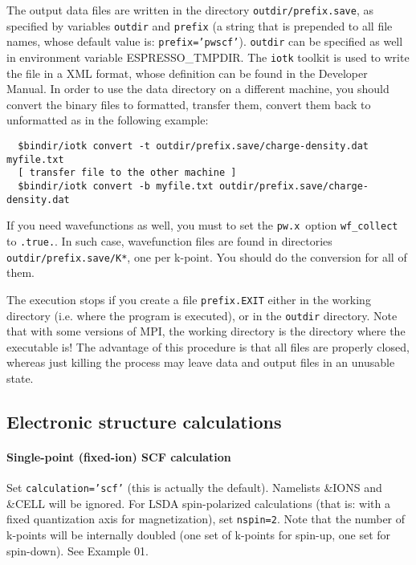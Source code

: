 \documentclass[12pt,a4paper]{article}
\def\pwx{\texttt{pw.x}}
\begin{document}
The output data files are written in the directory \texttt{outdir/prefix.save}, as specified by variables
\texttt{outdir} and \texttt{prefix} 
(a string that is prepended
to all file names, whose default value is: \texttt{prefix='pwscf'}). \texttt{outdir} can be specified
as well in environment variable ESPRESSO\_TMPDIR. The \texttt{iotk}
toolkit is used to write the file in a XML format, whose definition can
be found in the Developer Manual. In order to use the data directory
on a different machine, you should convert the binary files to formatted,
transfer them, convert them back to unformatted as in the following 
example:
\begin{verbatim}
  $bindir/iotk convert -t outdir/prefix.save/charge-density.dat myfile.txt
  [ transfer file to the other machine ]
  $bindir/iotk convert -b myfile.txt outdir/prefix.save/charge-density.dat
\end{verbatim}
If you need wavefunctions as well, you must to set the \pwx\ option 
\texttt{wf\_collect} to \texttt{.true.}. In such case, wavefunction files 
are found in directories \texttt{outdir/prefix.save/K*}, one per k-point.
You should do the conversion for all of them.

The execution stops if you create a file \texttt{prefix.EXIT} either
in the working directory (i.e. where the program is executed), or in
the  \texttt{outdir} directory. Note that with some versions of MPI,
the working directory  is the directory where the executable is! 
The advantage of this procedure is that all files are properly closed, 
whereas  just killing the process may leave data and output files in 
an unusable state.

\subsection{Electronic structure calculations}
\paragraph{Single-point (fixed-ion) SCF calculation} 
Set \texttt{calculation='scf'} (this is actually the default).
Namelists \&IONS and \&CELL will be ignored. For LSDA spin-polarized 
calculations (that is: with a fixed quantization axis for magnetization),
set \texttt{nspin=2}. Note that the number of k-points will be internally
doubled (one set of k-points for spin-up, one set for spin-down).
See Example 01.
\end{document}
